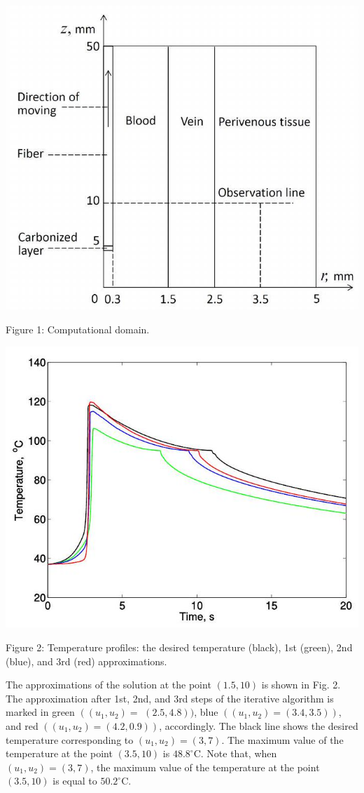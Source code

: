 \documentclass[10pt]{article}
\begin{document}
\includegraphics[max width=\textwidth]{2022_10_23_0545711a836d5ec06b12g-5}

Figure 1: Computational domain.

\includegraphics[max width=\textwidth]{2022_10_23_0545711a836d5ec06b12g-5(1)}

Figure 2: Temperature profiles: the desired temperature (black), 1st (green), 2nd (blue), and 3rd (red) approximations.

The approximations of the solution at the point $(1.5,10)$ is shown in Fig. 2. The approximation after 1st, 2nd, and 3rd steps of the iterative algorithm is marked in green $\left(\left(u_{1}, u_{2}\right)=\right.$ $(2.5,4.8))$, blue $\left(\left(u_{1}, u_{2}\right)=(3.4,3.5)\right)$, and red $\left(\left(u_{1}, u_{2}\right)=(4.2,0.9)\right)$, accordingly. The black line shows the desired temperature corresponding to $\left(u_{1}, u_{2}\right)=(3,7)$. The maximum value of the temperature at the point $(3.5,10)$ is $48.8^{\circ} \mathrm{C}$. Note that, when $\left(u_{1}, u_{2}\right)=(3,7)$, the maximum value of the temperature at the point $(3.5,10)$ is equal to $50.2^{\circ} \mathrm{C}$.
\end{document}
